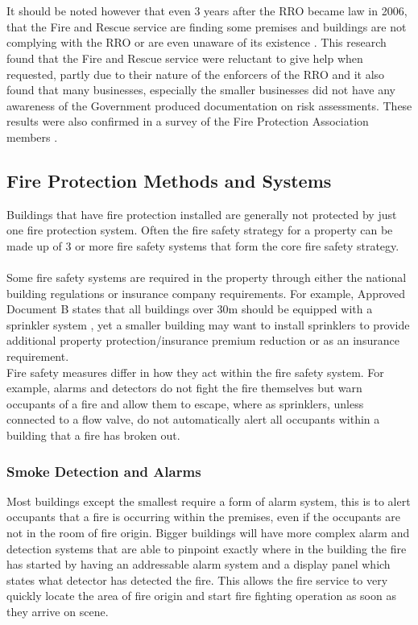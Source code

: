 \documentclass[table,a4paper,oneside]{book}
\begin{document}
\\
\\
It should be noted however that even 3 years after the RRO became law in 2006, that the Fire and Rescue service are finding some premises and buildings are not complying with the RRO or are even unaware of its existence \citep{Communities2009}. This research found that the Fire and Rescue service were reluctant to give help when requested, partly due to their nature of the enforcers of the RRO and it also found that many businesses, especially the smaller businesses did not have any awareness of the Government produced documentation on risk assessments. These results were also confirmed in a survey of the Fire Protection Association members \citep{Wilkinson2008}.
\subsection{Fire Protection Methods and Systems}
Buildings that have fire protection installed are generally not protected by just one fire protection system. Often the fire safety strategy for a property can be made up of 3 or more fire safety systems that form the core fire safety strategy. 
\\
\\
Some fire safety systems are required in the property through either the national building regulations or insurance company requirements. For example, Approved Document B states that all buildings over 30m should be equipped with a sprinkler system \citep{Communities2006}, yet a smaller building may want to install sprinklers to provide additional property protection/insurance premium reduction or as an insurance requirement.
\\
Fire safety measures differ in how they act within the fire safety system. For example, alarms and detectors do not fight the fire themselves but warn occupants of a fire and allow them to escape, where as sprinklers, unless connected to a flow valve, do not automatically alert all occupants within a building that a fire has broken out.
\subsubsection{Smoke Detection and Alarms}
Most buildings except the smallest require a form of alarm system, this is to alert occupants that a fire is occurring within the premises, even if the occupants are not in the room of fire origin. Bigger buildings will have more complex alarm and detection systems that are able to pinpoint exactly where in the building the fire has started by having an addressable alarm system and a display panel which states what detector has detected the fire. This allows the fire service to very quickly locate the area of fire origin and start fire fighting operation as soon as they arrive on scene.
\end{document}
